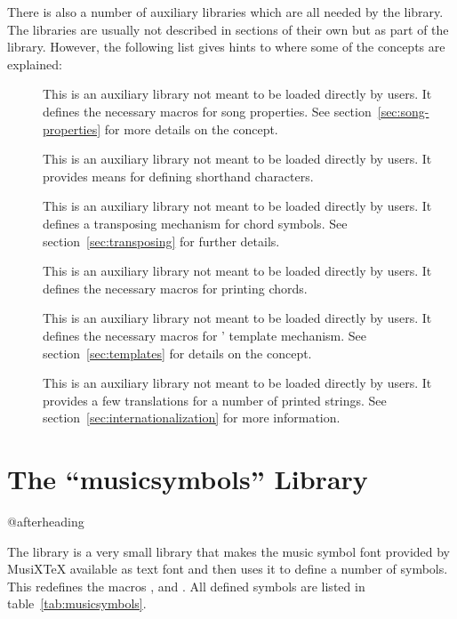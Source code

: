 \documentclass[load-preamble+]{cnltx-doc}
\def\library*#1{``#1''}%
\begin{document}
There is also a number of auxiliary libraries which are all needed by
the  library.  The libraries are usually not described in
sections of their own but as part of the  library.  However,
the following list gives hints to where some of the concepts are explained:
\begin{description}
  \item[] This is an auxiliary library not meant to be
    loaded directly by users.  It defines the necessary macros for song
    properties.  See section~\ref{sec:song-properties} for more details on the
    concept.
  \item[] This is an auxiliary library not meant to be
    loaded directly by users.  It provides means for defining shorthand
    characters.
  \item[]  This is an auxiliary library not meant to be
    loaded directly by users.  It defines a transposing mechanism for chord
    symbols.  See section~\ref{sec:transposing} for further details.
  \item[]  This is an auxiliary library not meant to be
    loaded directly by users.  It defines the necessary macros for printing
    chords.
  \item[] This is an auxiliary library not meant to be
    loaded directly by users.  It defines the necessary macros for
    \leadsheets' template mechanism.  See section~\ref{sec:templates} for
    details on the concept.
  \item[] This is an auxiliary library not meant to be
    loaded directly by users.  It provides a few translations for a number of
    printed strings.  See section~\ref{sec:internationalization} for more
    information.
\end{description}

\part{The \library*{musicsymbols} Library}\label{part:musicsymbols-library}
\vspace*{\baselineskip}\csname @afterheading\endcsname

The \musicsymbols{} library is a very small library that makes the music
symbol font provided by MusiX\TeX{} available as text font and then uses it to
define a number of symbols.  This redefines the macros , 
and .  All defined symbols are listed in
table~\ref{tab:musicsymbols}.
\end{document}

